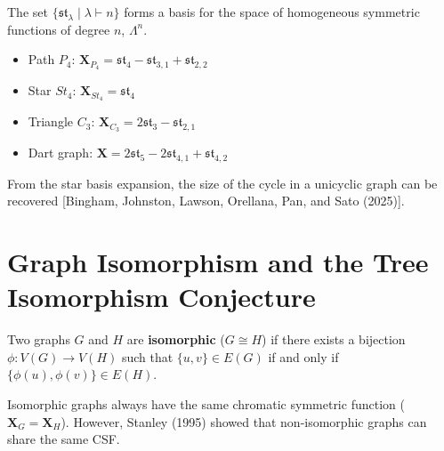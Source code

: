 \documentclass[12pt]{memoir}
\begin{document}
\begin{ptcb}
\begin{Th}
The set $\{\mathfrak{st}_\lambda \mid \lambda \vdash n\}$ forms a basis for the space of homogeneous symmetric functions of degree $n$, $\Lambda^n$.
\end{Th}
\end{ptcb}

\begin{Ex}
\begin{itemize}
    \item Path $P_4$: $\mathbf{X}_{P_4} = \mathfrak{st}_4 - \mathfrak{st}_{3,1} + \mathfrak{st}_{2,2}$
    \item Star $St_4$: $\mathbf{X}_{St_4} = \mathfrak{st}_4$
\end{itemize}
\end{Ex}

\begin{Ex}
\begin{itemize}
    \item Triangle $C_3$: $\mathbf{X}_{C_3} = 2 \mathfrak{st}_3 - \mathfrak{st}_{2,1}$
    \item Dart graph: $\mathbf{X} = 2 \mathfrak{st}_5 - 2 \mathfrak{st}_{4,1} + \mathfrak{st}_{4,2}$
\end{itemize}
From the star basis expansion, the size of the cycle in a unicyclic graph can be recovered [Bingham, Johnston, Lawson, Orellana, Pan, and Sato (2025)].
\end{Ex}

\newpage

\section{Graph Isomorphism and the Tree Isomorphism Conjecture}

\begin{ptcb}
\begin{Def}
Two graphs $G$ and $H$ are \textbf{isomorphic} ($G \cong H$) if there exists a bijection $\phi: V(G) \to V(H)$ such that $\{u, v\} \in E(G)$ if and only if $\{\phi(u), \phi(v)\} \in E(H)$.
\end{Def}
\end{ptcb}

Isomorphic graphs always have the same chromatic symmetric function ($\mathbf{X}_G = \mathbf{X}_H$). However, Stanley (1995) showed that non-isomorphic graphs can share the same CSF.
\end{document}
